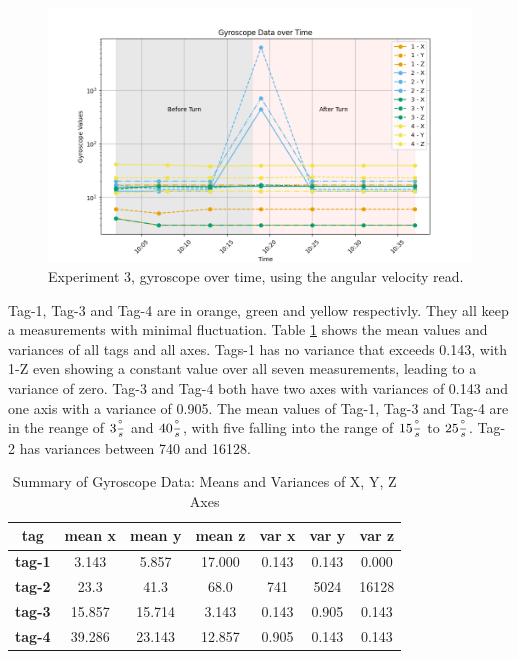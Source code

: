 \begin{figure}[ht!]
	\includegraphics[width=\linewidth]{graphics/exp/exp4_2_gyro_data_plot_2.png}
	\caption{Experiment 3, gyroscope over time, using the angular velocity read.}
	\label{f:exp4_graphs_gyro_2}
\end{figure}

Tag-1, Tag-3 and Tag-4 are in orange, green and yellow respectivly.
They all keep a measurements with minimal fluctuation.
Table \ref{tab:gyro_mean_2} shows the mean values and variances of all tags and all axes.
Tags-1 has no variance that exceeds 0.143, with 1-Z even showing a constant value over all seven measurements, leading to a variance of zero.
Tag-3 and Tag-4 both have two axes with variances of 0.143 and one axis with a variance of 0.905.
The mean values of Tag-1, Tag-3 and Tag-4 are in the reange of $3\frac{^\circ}{s}$ and $40\frac{^\circ}{s}$, with five falling into the range of $15\frac{^\circ}{s}$ to $25\frac{^\circ}{s}$.
Tag-2 has variances between 740 and 16128.

\begin{table}[h!]
\centering
\caption{Summary of Gyroscope Data: Means and Variances of X, Y, Z Axes}
\begin{tabular}{c|c c c|c c c|}
\hline
\textbf{tag} & \textbf{mean x} & \textbf{mean y} & \textbf{mean z} & \textbf{var x} & \textbf{var y} & \textbf{var z} \\
\hline
\textbf{tag-1} & 3.143 & 5.857 & 17.000 & 0.143 & 0.143 & 0.000 \\
\textbf{tag-2} & 23.3 & 41.3 & 68.0 & 741 & 5024 & 16128 \\
\textbf{tag-3} & 15.857 & 15.714 & 3.143 & 0.143 & 0.905 & 0.143 \\
\textbf{tag-4} & 39.286 & 23.143 & 12.857 & 0.905 & 0.143 & 0.143 \\
\hline
\end{tabular}
\label{tab:gyro_mean_2}
\end{table}


